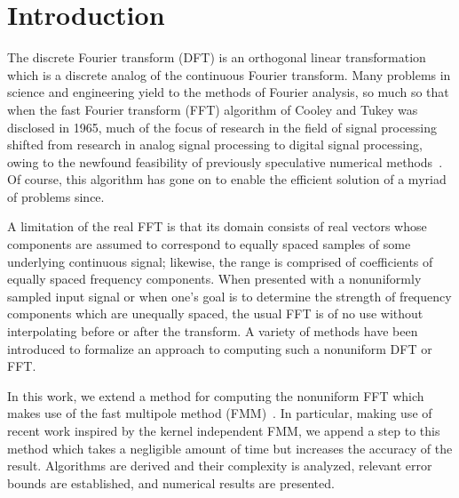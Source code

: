 \section{Introduction}

The discrete Fourier transform (DFT) is an orthogonal linear
transformation which is a discrete analog of the continuous Fourier
transform. Many problems in science and engineering yield to the
methods of Fourier analysis, so much so that when the fast Fourier
transform (FFT) algorithm of Cooley and Tukey was disclosed in 1965,
much of the focus of research in the field of signal processing
shifted from research in analog signal processing to digital signal
processing, owing to the newfound feasibility of previously
speculative numerical methods~\cite{book:dsp75}. Of course, this
algorithm has gone on to enable the efficient solution of a myriad of
problems since.

A limitation of the real FFT is that its domain consists of real
vectors whose components are assumed to correspond to equally spaced
samples of some underlying continuous signal; likewise, the range is
comprised of coefficients of equally spaced frequency components. When
presented with a nonuniformly sampled input signal or when one's goal
is to determine the strength of frequency components which are
unequally spaced, the usual FFT is of no use without interpolating
before or after the transform. A variety of methods have been
introduced to formalize an approach to computing such a nonuniform DFT
or FFT.\@

In this work, we extend a method for computing the nonuniform FFT
which makes use of the fast multipole method
(FMM)~\cite{Dutt95fastfourierII}. In particular, making use of recent
work inspired by the kernel independent FMM, we append a step to this
method which takes a negligible amount of time but increases the
accuracy of the result. Algorithms are derived and their complexity is
analyzed, relevant error bounds are established, and numerical results
are presented.

